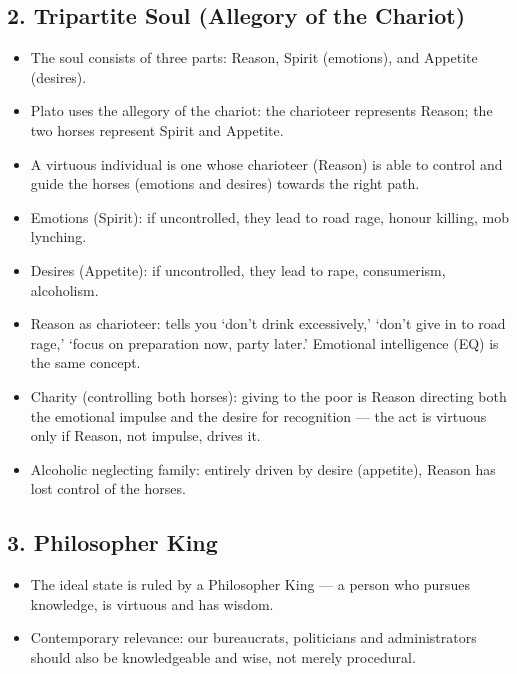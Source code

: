 \subsection*{2. Tripartite Soul (Allegory of the Chariot)}
\begin{KeyConcept}
\begin{itemize}
\item The soul consists of three parts: Reason, Spirit (emotions), and Appetite (desires).
\item Plato uses the allegory of the chariot: the charioteer represents Reason; the two horses represent Spirit and Appetite.
\item A virtuous individual is one whose charioteer (Reason) is able to control and guide the horses (emotions and desires) towards the right path.
\item Emotions (Spirit): if uncontrolled, they lead to road rage, honour killing, mob lynching.
\item Desires (Appetite): if uncontrolled, they lead to rape, consumerism, alcoholism.
\item Reason as charioteer: tells you `don't drink excessively,' `don't give in to road rage,' `focus on preparation now, party later.' Emotional intelligence (EQ) is the same concept.
\end{itemize}
\end{KeyConcept}

\begin{ExampleBox}
\begin{itemize}
\item Charity (controlling both horses): giving to the poor is Reason directing both the emotional impulse and the desire for recognition --- the act is virtuous only if Reason, not impulse, drives it.
\item Alcoholic neglecting family: entirely driven by desire (appetite), Reason has lost control of the horses.
\end{itemize}
\end{ExampleBox}

\subsection*{3. Philosopher King}
\begin{KeyConcept}
\begin{itemize}
\item The ideal state is ruled by a Philosopher King --- a person who pursues knowledge, is virtuous and has wisdom.
\item Contemporary relevance: our bureaucrats, politicians and administrators should also be knowledgeable and wise, not merely procedural.
\end{itemize}
\end{KeyConcept}


